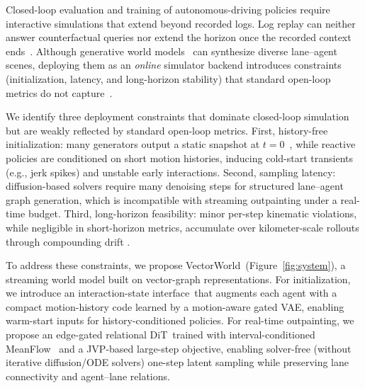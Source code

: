 \documentclass{article}
\newcommand{\VectorWorld}{VectorWorld}
\newcommand{\DeltaSim}{\(\Delta\)Sim}
\newcommand{\EdgeDiT}{edge-gated relational DiT}
\newcommand{\MotionVAE}{motion-aware gated VAE}
\newcommand{\MeanFlow}{MeanFlow}
\newcommand{\InteractionState}{interaction-state interface}
\theoremstyle{plain}
\theoremstyle{definition}
\theoremstyle{remark}
\begin{document}
Closed-loop evaluation and training of autonomous-driving policies require interactive simulations that extend beyond recorded logs.
Log replay can neither answer counterfactual queries nor extend the horizon once the recorded context ends~\cite{caesar2021nuplan,gulino2023waymax}. Although generative world models~\cite{ha2018world,feng2023trafficgen,tan2023language,yang2025wcdt} can synthesize diverse lane--agent scenes, deploying them as an \emph{online} simulator backend introduces constraints (initialization, latency, and long-horizon stability) that standard open-loop metrics do not capture~\cite{tan2025scenediffuserpp}.

We identify three deployment constraints that dominate closed-loop simulation but are weakly reflected by standard open-loop metrics. First, history-free initialization: many generators output a static snapshot at \(t=0\)~\cite{rowe2025scenario}, while reactive policies are conditioned on short motion histories, inducing cold-start transients (e.g., jerk spikes) and unstable early interactions. Second, sampling latency: diffusion-based solvers require many denoising steps \cite{chitta2024sledge,tan2025scenediffuserpp} for structured lane--agent graph generation, which is incompatible with streaming outpainting under a real-time budget. Third, long-horizon feasibility: minor per-step kinematic violations, while negligible in short-horizon metrics, accumulate over kilometer-scale rollouts through compounding drift \cite{rowe2024ctrlsim, lin2025causal}.

To address these constraints, we propose \VectorWorld\ (Figure~\ref{fig:system}), a streaming world model built on vector-graph representations.
For initialization, we introduce an \InteractionState\ that augments each agent with a compact motion-history code learned by a \MotionVAE, enabling warm-start inputs for history-conditioned policies.
For real-time outpainting, we propose an \EdgeDiT\ trained with interval-conditioned \MeanFlow\ \cite{geng2025mean} and a JVP-based large-step objective, enabling solver-free (without iterative diffusion/ODE solvers) one-step latent sampling while preserving lane connectivity and agent--lane relations.

\end{document}
